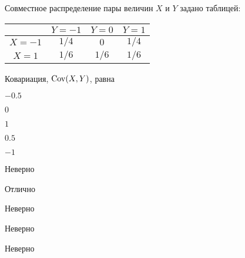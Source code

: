 
\begin{question}
Совместное распределение пары величин \(X\) и \(Y\) задано таблицей:

\begin{tabular}{@{}c|ccc@{}}
\toprule
       & $Y=-1$ & $Y=0$ & $Y=1$ \\ \midrule
$X=-1$ & $1/4$  & $0$   & $1/4$ \\
$X=1$  & $1/6$  & $1/6$ & $1/6$ \\ \bottomrule
\end{tabular}

\vspace{0.5cm}

Ковариация, \(\operatorname{Cov}(X,Y)\), равна
\begin{answerlist}
  \item \(-0.5\)
  \item \(0\)
  \item \(1\)
  \item \(0.5\)
  \item \(-1\)
\end{answerlist}
\end{question}

\begin{solution}
\begin{answerlist}
  \item Неверно
  \item Отлично
  \item Неверно
  \item Неверно
  \item Неверно
\end{answerlist}
\end{solution}

